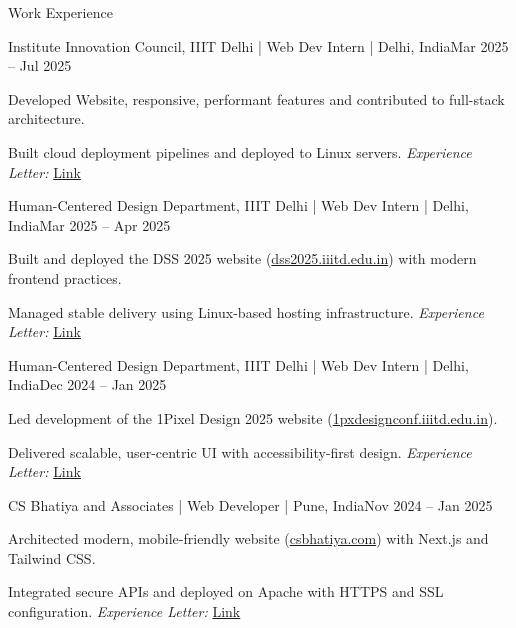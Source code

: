 \documentclass[10pt]{resume}
\begin{document}
\begin{rSection}{Work Experience}

\begin{rSubsection}{Institute Innovation Council, IIIT Delhi | Web Dev Intern | Delhi, India}{Mar 2025 -- Jul 2025}
    \item Developed Website, responsive, performant features and contributed to full-stack architecture.
    \item Built cloud deployment pipelines and deployed to Linux servers. \textit{Experience Letter:} \href{https://drive.google.com/file/d/15J8h-KHd-D_vZ8FEkdgwQNcVEaaCNLBa/view}{Link}
\end{rSubsection}

\begin{rSubsection}{Human-Centered Design Department, IIIT Delhi | Web Dev Intern | Delhi, India}{Mar 2025 -- Apr 2025}
    \item Built and deployed the DSS 2025 website (\href{https://dss2025.iiitd.edu.in}{dss2025.iiitd.edu.in}) with modern frontend practices.
    \item Managed stable delivery using Linux-based hosting infrastructure. \textit{Experience Letter:} \href{https://drive.google.com/file/d/1ZBmdpn35tOQ6O-hA4DlZQFGS6P-6t2TZ/view?usp=sharing}{Link}
\end{rSubsection}



\begin{rSubsection}{Human-Centered Design Department, IIIT Delhi | Web Dev Intern | Delhi, India}{Dec 2024 -- Jan 2025}
    \item Led development of the 1Pixel Design 2025 website (\href{https://1pxdesignconf.iiitd.edu.in}{1pxdesignconf.iiitd.edu.in}).
    \item Delivered scalable, user-centric UI with accessibility-first design. \textit{Experience Letter:} \href{https://drive.google.com/file/d/1ZBmdpn35tOQ6O-hA4DlZQFGS6P-6t2TZ/view?usp=sharing}{Link}
\end{rSubsection}


\begin{rSubsection}{CS Bhatiya and Associates | Web Developer | Pune, India}{Nov 2024 -- Jan 2025}
    \item Architected modern, mobile-friendly website (\href{https://csbhatiya.com}{csbhatiya.com}) with Next.js and Tailwind CSS.
    \item Integrated secure APIs and deployed on Apache with HTTPS and SSL configuration. \textit{Experience Letter:} \href{https://drive.google.com/file/d/1ERZEwunqZLcGdk9Fz-A9g0KW0qIyfU5l/view?usp=sharing}{Link}
\end{rSubsection}


\end{rSection}
\end{document}
